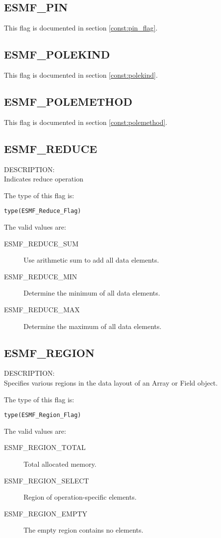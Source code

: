\subsection{ESMF\_PIN}
This flag is documented in section \ref{const:pin_flag}.

\subsection{ESMF\_POLEKIND}
This flag is documented in section \ref{const:polekind}.

\subsection{ESMF\_POLEMETHOD}
This flag is documented in section \ref{const:polemethod}.

\subsection{ESMF\_REDUCE}
\label{const:reduce}
{\sf DESCRIPTION:\\}
Indicates reduce operation

The type of this flag is:

{\tt type(ESMF\_Reduce\_Flag)}

The valid values are:
\begin{description}
   \item [ESMF\_REDUCE\_SUM]
         Use arithmetic sum to add all data elements.
   \item [ESMF\_REDUCE\_MIN]
         Determine the minimum of all data elements.
   \item [ESMF\_REDUCE\_MAX]
         Determine the maximum of all data elements.
\end{description}

\subsection{ESMF\_REGION}
\label{const:region}
{\sf DESCRIPTION:\\}
Specifies various regions in the data layout of an Array or Field object.

The type of this flag is:

{\tt type(ESMF\_Region\_Flag)}

The valid values are:
\begin{description}
\item [ESMF\_REGION\_TOTAL]
      Total allocated memory.
\item [ESMF\_REGION\_SELECT]
      Region of operation-specific elements.
\item [ESMF\_REGION\_EMPTY]
      The empty region contains no elements.
\end{description}

